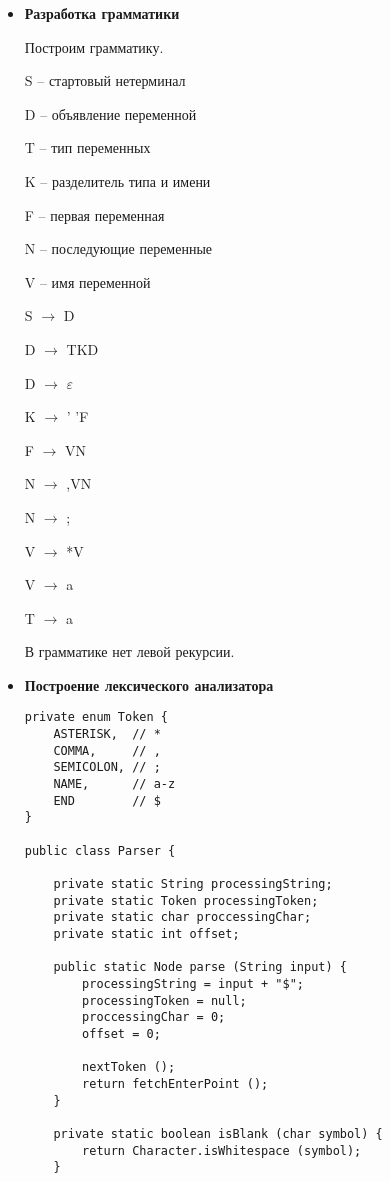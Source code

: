 \documentclass[12pt]{article}
\begin{document}
\begin{itemize}
    \item \textbf{Разработка грамматики}

            Построим грамматику.
            
            S -- стартовый нетерминал

            D -- объявление переменной

            T -- тип переменных

            K -- разделитель типа и имени

            F -- первая переменная

            N -- последующие переменные

            V -- имя переменной
            

            S $\rightarrow$ D

            D $\rightarrow$ TKD

            D $\rightarrow$ $\varepsilon$

            K $\rightarrow$ ' 'F

            F $\rightarrow$ VN

            N $\rightarrow$ ,VN

            N $\rightarrow$ ;

            V $\rightarrow$ *V

            V $\rightarrow$ a

            T $\rightarrow$ a


            В грамматике нет левой рекурсии.

    \item \textbf{Построение лексического анализатора}
        \begin{verbatim}
private enum Token {
    ASTERISK,  // *
    COMMA,     // ,
    SEMICOLON, // ;
    NAME,      // a-z
    END        // $
}

public class Parser {
    
    private static String processingString;
    private static Token processingToken;
    private static char proccessingChar;
    private static int offset;
    
    public static Node parse (String input) {
        processingString = input + "$";
        processingToken = null;
        proccessingChar = 0;
        offset = 0;
        
        nextToken ();
        return fetchEnterPoint ();
    }
    
    private static boolean isBlank (char symbol) {
        return Character.isWhitespace (symbol);
    }
    

\end{verbatim}
\end{itemize}
\end{document}
